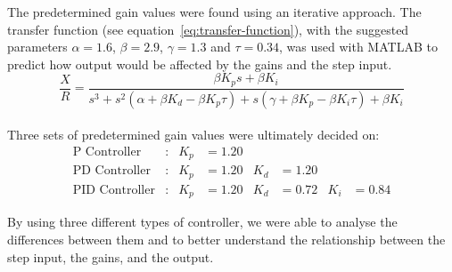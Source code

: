 \documentclass[12pt]{article} %
\begin{document}
\noindent The predetermined gain values were found using an iterative approach. The transfer function (see equation\ \ref{eq:transfer-function}), with the suggested parameters $\alpha = 1.6$, $\beta = 2.9$, $\gamma = 1.3$ and $\tau = 0.34$, was used with MATLAB to predict how output would be affected by the gains and the step input.
\\ 

\begin{equation}
\label{eq:transfer-function}
\frac{X}{R} = \frac{\beta K_p s + \beta K_i}{s^3 + s^2 (\alpha + \beta K_d - \beta K_p \tau) + s(\gamma + \beta K_p - \beta K_i \tau) + \beta K_i}
\end{equation}
\\ 

\noindent Three sets of predetermined gain values were ultimately decided on:
\begin{align*}
\textrm{P Controller} &: & K_p &= 1.20 & & & \\[1em]
\textrm{PD Controller} &: & K_p &= 1.20 & K_d &= 1.20 & & \\[1em]
\textrm{PID Controller} &: & K_p &= 1.20 & K_d &= 0.72 & K_i &= 0.84
\end{align*}

\noindent By using three different types of controller, we were able to analyse the differences between them and to better understand the relationship between the step input, the gains, and the output.
\\ 
\end{document}
